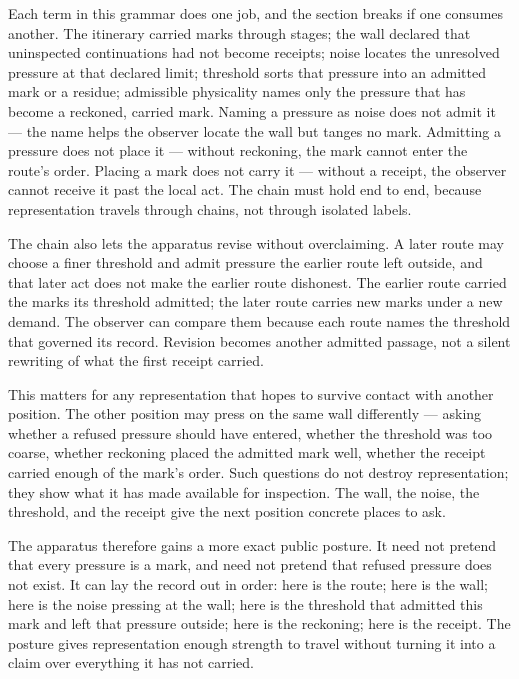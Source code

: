 Each term in this grammar does one job, and the section breaks if one consumes another. The itinerary carried marks through stages; the wall declared that uninspected continuations had not become receipts; noise locates the unresolved pressure at that declared limit; threshold sorts that pressure into an admitted mark or a residue; admissible physicality names only the pressure that has become a reckoned, carried mark. Naming a pressure as noise does not admit it --- the name helps the observer locate the wall but tanges no mark. Admitting a pressure does not place it --- without reckoning, the mark cannot enter the route's order. Placing a mark does not carry it --- without a receipt, the observer cannot receive it past the local act. The chain must hold end to end, because representation travels through chains, not through isolated labels.

The chain also lets the apparatus revise without overclaiming. A later route may choose a finer threshold and admit pressure the earlier route left outside, and that later act does not make the earlier route dishonest. The earlier route carried the marks its threshold admitted; the later route carries new marks under a new demand. The observer can compare them because each route names the threshold that governed its record. Revision becomes another admitted passage, not a silent rewriting of what the first receipt carried.

This matters for any representation that hopes to survive contact with another position. The other position may press on the same wall differently --- asking whether a refused pressure should have entered, whether the threshold was too coarse, whether reckoning placed the admitted mark well, whether the receipt carried enough of the mark's order. Such questions do not destroy representation; they show what it has made available for inspection. The wall, the noise, the threshold, and the receipt give the next position concrete places to ask.

The apparatus therefore gains a more exact public posture. It need not pretend that every pressure is a mark, and need not pretend that refused pressure does not exist. It can lay the record out in order: here is the route; here is the wall; here is the noise pressing at the wall; here is the threshold that admitted this mark and left that pressure outside; here is the reckoning; here is the receipt. The posture gives representation enough strength to travel without turning it into a claim over everything it has not carried.

